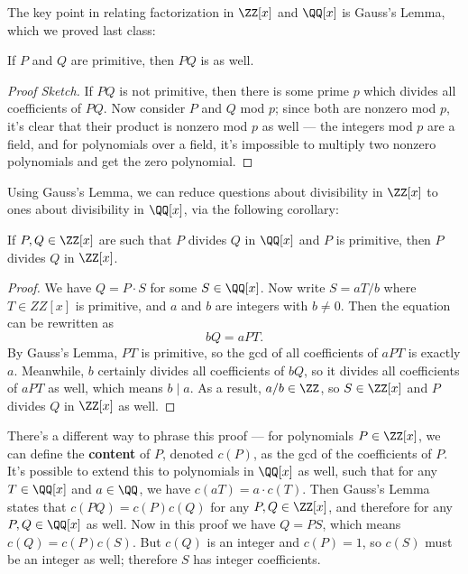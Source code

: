 The key point in relating factorization in $\ZZ[x]$ and $\QQ[x]$ is Gauss's Lemma, which we proved last class: 

\begin{lemma}
If $P$ and $Q$ are primitive, then $PQ$ is as well.
\end{lemma}

\begin{proof}[Proof Sketch]
If $PQ$ is not primitive, then there is some prime $p$ which divides all coefficients of $PQ$. Now consider $P$ and $Q$ mod $p$; since both are nonzero mod $p$, it's clear that their product is nonzero mod $p$ as well --- the integers mod $p$ are a field, and for polynomials over a field, it's impossible to multiply two nonzero polynomials and get the zero polynomial. 
\end{proof}

Using Gauss's Lemma, we can reduce questions about divisibility in $\ZZ[x]$ to ones about divisibility in $\QQ[x]$, via the following corollary:

\begin{corollary}\label{primitive}
If $P, Q \in \ZZ[x]$ are such that $P$ divides $Q$ in $\QQ[x]$ and $P$ is primitive, then $P$ divides $Q$ in $\ZZ[x]$.
\end{corollary}

\begin{proof}
We have $Q  = P\cdot S$ for some $S \in \QQ[x]$. Now write $S = aT/b$ where $T \in ZZ[x]$ is primitive, and $a$ and $b$ are integers with $b \neq 0$. Then the equation can be rewritten as \[bQ = aPT.\] By Gauss's Lemma, $PT$ is primitive, so the gcd of all coefficients of $aPT$ is exactly $a$. Meanwhile, $b$ certainly divides all coefficients of $bQ$, so it divides all coefficients of $aPT$ as well, which means $b \mid a$. As a result, $a/b \in \ZZ$, so $S \in \ZZ[x]$ and $P$ divides $Q$ in $\ZZ[x]$ as well.
\end{proof}

\begin{note}
There's a different way to phrase this proof --- for polynomials $P \in \ZZ[x]$, we can define the \textbf{content} of $P$, denoted $c(P)$, as the gcd of the coefficients of $P$. It's possible to extend this to polynomials in $\QQ[x]$ as well, such that for any $T \in \QQ[x]$ and $a \in \QQ$, we have $c(aT) = a\cdot c(T)$. Then Gauss's Lemma states that $c(PQ) = c(P)c(Q)$ for any $P, Q \in \ZZ[x]$, and therefore for any $P, Q \in \QQ[x]$ as well. Now in this proof we have $Q = PS$, which means $c(Q) = c(P)c(S)$. But $c(Q)$ is an integer and $c(P) = 1$, so $c(S)$ must be an integer as well; therefore $S$ has integer coefficients. %
\end{note}

